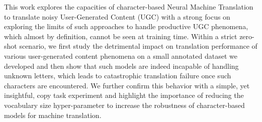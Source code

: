 This work explores the capacities of character-based Neural Machine Translation to translate noisy User-Generated Content (UGC) with a strong focus on exploring the limits of such approaches to handle productive UGC phenomena, which almost by definition, cannot be seen at training time. Within a strict zero-shot scenario, we first study the detrimental impact on translation performance of various user-generated content phenomena on a small annotated dataset we developed and then show that such models are indeed incapable of handling unknown letters, which leads to catastrophic translation failure once such characters are encountered. We further confirm this behavior with a simple, yet insightful, copy task experiment and highlight the importance of reducing the vocabulary size hyper-parameter to increase the robustness of character-based models for machine translation.
